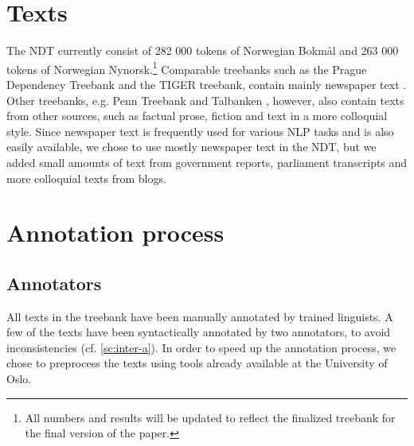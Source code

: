 \documentclass[11pt,a4paper]{article}
\begin{document}

\section{Texts}
The NDT currently consist of 282 000 tokens of Norwegian Bokmål and 263 000 tokens of Norwegian Nynorsk.\footnote{All numbers and results will be updated to reflect the finalized treebank for the final version of the paper.} Comparable treebanks such as the Prague Dependency Treebank and the TIGER treebank, contain mainly newspaper text \cite{Boh:Haj:Hla:2003,Bra:2004}. Other treebanks, e.g. Penn Treebank and Talbanken \cite{Mar:San:Mar:93,Niv:Nil:Hal:2006}, however, also contain texts from other sources, such as factual prose, fiction and text in a more colloquial style. Since newspaper text is frequently used for various NLP tasks and is also easily available, we chose to use mostly newspaper text in the NDT, but we added small amounts of text from government reports, parliament transcripts and more colloquial texts from blogs.



\section{Annotation process}
\subsection{Annotators}
All texts in the treebank have been manually annotated by trained linguists. A
few of the texts have been syntactically annotated by two annotators, to
avoid inconsistencies (cf. \ref{sc:inter-a}). In order to speed up the annotation
process, we chose to preprocess the texts using tools already available at the
University of Oslo.
\end{document}
